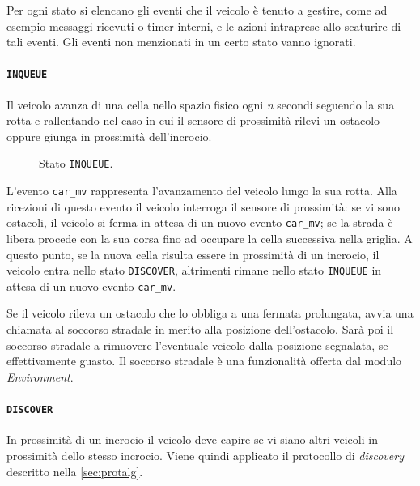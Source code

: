 \documentclass{memoir}
\begin{document}
Per ogni stato si elencano gli eventi che il veicolo è tenuto a gestire, come ad
esempio messaggi ricevuti o timer interni, e le azioni intraprese allo scaturire
di tali eventi. Gli eventi non menzionati in un certo stato vanno ignorati.

\paragraph{\texttt{INQUEUE}}
Il veicolo avanza di una cella nello spazio fisico ogni \emph{n} secondi
seguendo la sua rotta e rallentando nel caso in cui il sensore di prossimità
rilevi un ostacolo oppure giunga in prossimità dell'incrocio.

\begin{figure}[h]
  \centering
  \caption{Stato \texttt{INQUEUE}.}                  
\end{figure}

L'evento \texttt{car\_mv} rappresenta l'avanzamento del veicolo lungo la sua
rotta. Alla ricezioni di questo evento il veicolo interroga il sensore di
prossimità: se vi sono ostacoli, il veicolo si ferma in attesa di un nuovo
evento \texttt{car\_mv}; se la strada è libera procede con la sua corsa fino ad
occupare la cella successiva nella griglia. A questo punto, se la nuova cella
risulta essere in prossimità di un incrocio, il veicolo entra nello stato
\texttt{DISCOVER}, altrimenti rimane nello stato \texttt{INQUEUE} in attesa di
un nuovo evento \texttt{car\_mv}.

Se il veicolo rileva un ostacolo che lo obbliga a una fermata prolungata, avvia
una chiamata al soccorso stradale in merito alla posizione dell'ostacolo. Sarà
poi il soccorso stradale a rimuovere l'eventuale veicolo dalla posizione
segnalata, se effettivamente guasto. Il soccorso stradale è una funzionalità
offerta dal modulo \emph{Environment}.

\paragraph{\texttt{DISCOVER}}
In prossimità di un incrocio il veicolo deve capire se vi siano altri veicoli in
prossimità dello stesso incrocio. Viene quindi applicato il protocollo di
\emph{discovery} descritto nella \cref{sec:protalg}.
\end{document}
